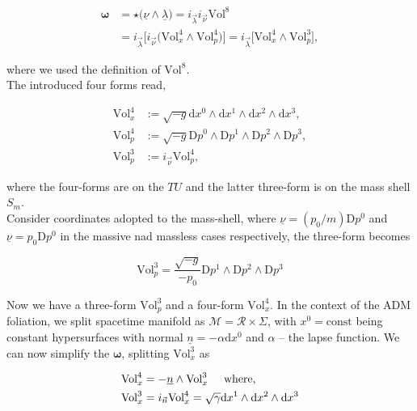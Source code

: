 \documentclass[11pt,a4paper,headinclude=true,DIV=14,BCOR=8mm,chapterprefix,listof=totoc,twoside,openright,abstracton]{scrbook}
\begin{document}
\begin{align}
    \boldsymbol{\omega} &= \star\big(\underline{\nu}\wedge\underline{\lambda}\big) = i_{\vec{\lambda}} i_{\vec{\nu}}\text{Vol}^8 \\
    &= i_{\vec{\lambda}}\Big[i_{\vec{\nu}}\big(\text{Vol}^{4}_{x}\wedge\text{Vol}^{4}_{p}\big)\Big] = i_{\vec{\lambda}} \big[\text{Vol}^{4}_{x}\wedge\text{Vol}^{3}_{p}\big],
\end{align}

where we used the definition of $\text{Vol}^8$. \\
The introduced four forms read,

\begin{align}
    \text{Vol}_x ^4 &:= \sqrt{-g} \text{d}x^{0} \wedge \text{d}x^{1} \wedge \text{d}x^{2} \wedge \text{d}x^{3}, \\
    \text{Vol}_p ^4 &:= \sqrt{-g} \text{D}p^{0} \wedge \text{D}p^{1} \wedge \text{D}p^{2} \wedge \text{D}p^{3}, \\
    \text{Vol}_p ^3 &:= i_{\vec{\nu}}\text{Vol}_p ^4,
\end{align}

where the four-forms are on the $TU$ and the latter three-form is on the mass shell $S_m$. \\

Consider coordinates adopted to the mass-shell, where $\underline{\nu} = (p_0/m)\text{D}p^0$ and $\underline{\nu} = p_0\text{D}p^0$ in the massive nad massless cases respectively, the three-form becomes

\begin{equation}
    \text{Vol}^3 _p =\frac{\sqrt{-g}}{-p_0}\text{D}p^1\wedge\text{D}p^2\wedge\text{D}p^3
\end{equation}

Now we have a three-form $\text{Vol}^3 _p$ and a four-form $\text{Vol}_x ^4$. In the context of the ADM foliation, we split spacetime manifold as $\mathcal{M}=\mathcal{R}\times\Sigma$, with $x^0 = \text{const}$ being constant hypersurfaces with normal $\underline{n} = - \alpha\text{d}x^0$ and $\alpha$ -- the lapse function. We can now simplify the $\boldsymbol{\omega}$, splitting $\text{Vol}_x ^3$ as 

\begin{align}
    \text{Vol}_x ^4 &= -\underline{n}\wedge\text{Vol}_x ^3 \hspace{5mm} \text{where,} \\
    \text{Vol}_x ^3 &= i_{\vec{n}}\text{Vol}_x ^4 = \sqrt{\gamma}\text{d}x^1\wedge\text{d}x^2\wedge\text{d}x^3
\end{align}
\end{document}
